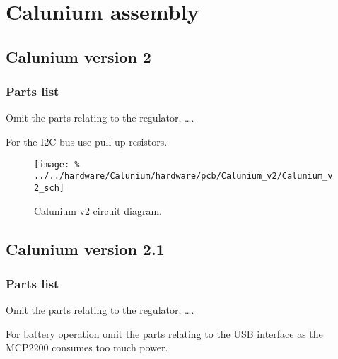 \chapter{Calunium assembly}

\section{Calunium version 2}


\subsection{Parts list}

Omit the parts relating to the  regulator, \ldots.

For the I2C bus use  pull-up resistors.

\begin{landscape}
  \begin{figure}[p]
    \centering
    \texttt{[image: \%
      ../../hardware/Calunium/hardware/pcb/Calunium\_v2/Calunium\_v2\_sch]}  
    \caption{Calunium v2 circuit diagram.}
    \label{fig:calunium-v2-cct-diag}
  \end{figure}
\end{landscape}

\section{Calunium version 2.1}

\subsection{Parts list}

Omit the parts relating to the  regulator, \ldots.

For battery operation omit the parts relating to the USB interface as
the MCP2200 consumes too much power.
